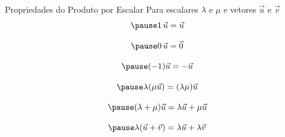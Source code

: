 \documentclass[fleqn,aspectratio=169,12pt]{beamer}
\begin{document}


\begin{frame}{Propriedades do Produto por Escalar}
  Para escalares $\lambda$ e $\mu$ e vetores $\vec{u}$ e $\vec{v}$
  \[
    \pause
    1 \, \vec{u} = \vec{u}
  \]

  \[
    \pause
    0 \, \vec{u} = \vec{0}
  \]

  \[
    \pause
    (-1)\vec{u} = -\vec{u}
  \]

  \[
    \pause
    \lambda(\mu\vec{u}) = (\lambda\mu)\vec{u}
  \]

  \[
    \pause
    (\lambda+\mu)\vec{u} = \lambda\vec{u}+\mu\vec{u}
  \]

  \[
    \pause
    \lambda(\vec{u}+\vec{v}) = \lambda\vec{u}+\lambda\vec{v}
  \]
\end{frame}




%
%

\end{document}
